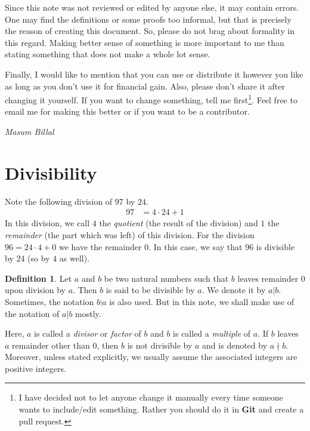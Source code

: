 \documentclass[a4paper, leqno]{article}
\theoremstyle{definition}
\newtheorem{definition}{Definition}
\theoremstyle{remark}
\begin{document}
		Since this note was not reviewed or edited by anyone else, it may contain errors. One may find the definitions or some proofs too informal, but that is precisely the reason of creating this document. So, please do not brag about formality in this regard. Making better sense of something is more important to me than stating something that does not make a whole lot sense.
		
		Finally, I would like to mention that you can use or distribute it however you like as long as you don't use it for financial gain. Also, please don't share it after changing it yourself. If you want to change something, tell me first\footnote{I have decided not to let anyone change it manually every time someone wants to include/edit something. Rather you should do it in \textbf{Git} and create a pull request.}. Feel free to email me for making this better or if you want to be a contributor.
			\begin{flushright}
				\slshape Masum Billal\\
				\date{October $10$, $2016$}
			\end{flushright}
		\newpage
	\section{Divisibility}
		Note the following division of $97$ by $24$.
			\begin{align*}
				97 & = 4\cdot24+1
			\end{align*}
		In this division, we call $4$ the \textit{quotient} (the result of the division) and $1$ the \textit{remainder} (the part which was left) of this division. For the division $96 = 24 · 4 + 0$ we have the remainder $0$. In this case, we say that $96$ is divisible by $24$ (so by $4$ as well).
			\begin{definition}
				Let $a$ and $b$ be two natural numbers such that $b$ leaves remainder $0$ upon division by $a$. Then $b$ is said to be divisible by $a$. We denote it by $a|b$. Sometimes, the notation $b\vdots a$ is also used. But in this note, we shall make use of the notation of $a|b$ mostly.
				
				Here, $a$ is called a \textit{divisor} or \textit{factor} of $b$ and $b$ is called a \textit{multiple} of $a$. If $b$ leaves $a$ remainder other than $0$, then $b$ is not divisible by $a$ and is denoted by $a\nmid b$. Moreover, unless stated explicitly, we usually assume the associated integers are positive integers.
			\end{definition}
			
\end{document}
